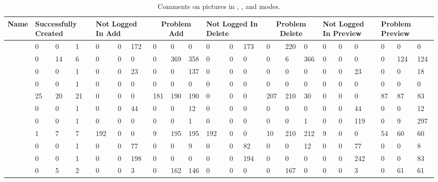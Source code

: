   \begin{table*}[htbp]
    \centering
    {\scriptsize
      \begin{tabular}{|l|p{3ex}p{3ex}p{4ex}|p{3ex}p{3ex}p{4ex}|p{3ex}p{3ex}p{4ex}|p{3ex}p{3ex}p{4ex}|p{3ex}p{3ex}p{4ex}|p{3ex}p{3ex}p{4ex}|p{3ex}p{3ex}p{4ex}|}
        \hline
        Name & \multicolumn{3}{|p{8ex}|}{Successfully Created} & \multicolumn{3}{|p{12ex}|}{Not Logged In Add} & \multicolumn{3}{|c|}{Problem Add} & \multicolumn{3}{|p{12ex}|}{Not Logged In Delete} & \multicolumn{3}{|c|}{Problem Delete} & \multicolumn{3}{|p{12ex}|}{Not Logged In Preview} & \multicolumn{3}{|p{10ex}|}{Problem Preview} \\
        \hline
        \acunetix{} & 0 & 0 & 1 & 0 & 0 & 172 & 0 & 0 & 0 & 0 & 0 & 173 & 0 & 220 & 0 & 0 & 0 & 0 & 0 & 0 & 0\\
        \appscan{} & 0 & 14 & 6 & 0 & 0 & 0 & 0 & 369 & 358 & 0 & 0 & 0 & 0 & 6 & 366 & 0 & 0 & 0 & 0 & 124 & 124 \\
        \burp{} & 0 & 0 & 1 & 0 & 0 & 23 & 0 & 0 & 137 & 0 & 0 & 0 & 0 & 0 & 0 & 0 & 0 & 23 & 0 & 0 & 18 \\
        \grendelscan{} & 0 & 0 & 1 & 0 & 0 & 0 & 0 & 0 & 0 & 0 & 0 & 0 & 0 & 0 & 0 & 0 & 0 & 0 & 0 & 0 & 0 \\
        \hailstorm{} & 25 & 20 & 21 & 0 & 0 & 0 & 181 & 190 & 190 & 0 & 0 & 0 & 207 & 210 & 30 & 0 & 0 & 0 & 87 & 87 & 83 \\
        \milescan{} & 0 & 0 & 1 & 0 & 0 & 44 & 0 & 0 & 12 & 0 & 0 & 0 & 0 & 0 & 0 & 0 & 0 & 44 & 0 & 0 & 12 \\
        \nstalker{} & 0 & 0 & 1 & 0 & 0 & 0 & 0 & 0 & 1 & 0 & 0 & 0 & 0 & 0 & 1 & 0 & 0 & 119 & 0 & 9 & 297 \\
        \ntospider{} & 1 & 7 & 7 & 192 & 0 & 0 & 9 & 195 & 195 & 192 & 0 & 0 & 10 & 210 & 212 & 9 & 0 & 0 & 54 & 60 & 60 \\
        \paros{} & 0 & 0 & 1 & 0 & 0 & 77 & 0 & 0 & 9 & 0 & 0 & 82 & 0 & 0 & 12 & 0 & 0 & 77 & 0 & 0 & 8 \\
        \waf{} & 0 & 0 & 1 & 0 & 0 & 198 & 0 & 0 & 0 & 0 & 0 & 194 & 0 & 0 & 0 & 0 & 0 & 242 & 0 & 0 & 83 \\
        \webinspect{} & 0 & 5 & 2 & 0 & 0 & 3 & 0 & 162 & 146 & 0 & 0 & 0 & 0 & 167 & 0 & 0 & 0 & 3 & 0 & 61 & 61 \\
        \hline
    \end{tabular}}
    \caption{Comments on pictures in \initial{}, \config{}, and \manual{} modes.}
    \label{comments-created}
  \end{table*}

